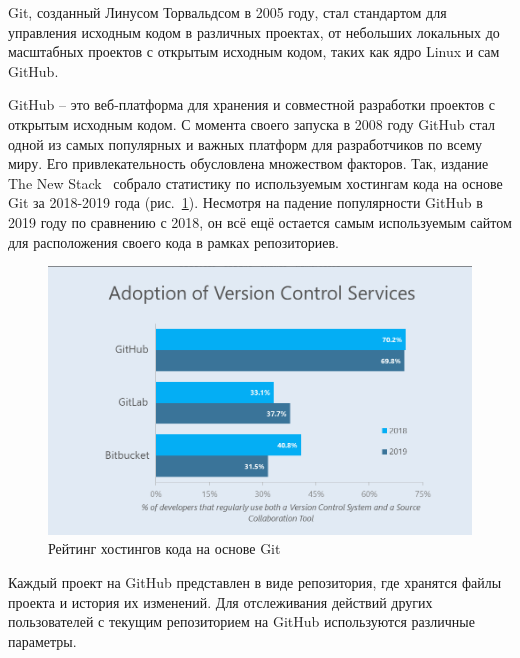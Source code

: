 Git, созданный Линусом Торвальдсом в 2005 году, стал стандартом для управления исходным кодом в различных проектах, от небольших локальных до масштабных проектов с открытым исходным кодом, таких как ядро Linux и сам GitHub.

GitHub -- это веб-платформа для хранения и совместной разработки проектов с открытым исходным кодом. С момента своего запуска в 2008 году GitHub стал одной из самых популярных и важных платформ для разработчиков по всему миру. Его привлекательность обусловлена множеством факторов. Так, издание The New Stack~\cite{GitRating} собрало статистику по используемым хостингам кода на основе Git за 2018-2019 года (рис.~\ref{ris:gitrating}). Несмотря на падение популярности GitHub в 2019 году по сравнению с 2018, он всё ещё остается самым используемым сайтом для расположения своего кода в рамках репозиториев.

\begin{figure}[h]
    \centering
    \includegraphics[width=1\linewidth]{pic/gitrating.png}
    \vspace{-1em}\caption{Рейтинг хостингов кода на основе Git}
    \label{ris:gitrating}
\end{figure}
\vspace{1em}

Каждый проект на GitHub представлен в виде репозитория, где хранятся файлы проекта и история их изменений. Для отслеживания действий других пользователей с текущим репозиторием на GitHub используются различные параметры.

